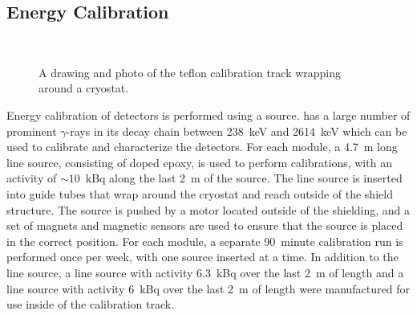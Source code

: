 \documentclass[/main.tex]{subfiles}
\begin{document}
\subsection{Energy Calibration} \label{sec:calibration}
\begin{figure}
  \centering
  ~
  \caption[Calibration track]{\label{fig:caltrack}
    A drawing and photo of the teflon calibration track wrapping around a cryostat.
  }
\end{figure}
Energy calibration of detectors is performed using a  source\cite{mjdcalibration}.
 has a large number of prominent $\gamma$-rays in its decay chain between 238~keV and 2614~keV which can be used to calibrate and characterize the detectors.
For each module, a 4.7~m long line source, consisting of  doped epoxy, is used to perform calibrations, with an activity of $\sim10$~kBq along the last 2~m of the source.
The line source is inserted into guide tubes that wrap around the cryostat and reach outside of the shield structure.
The source is pushed by a motor located outside of the shielding, and a set of magnets and magnetic sensors are used to ensure that the source is placed in the correct position.
For each module, a separate 90~minute calibration run is performed once per week, with one source inserted at a time.
In addition to the  line source, a  line source with activity 6.3~kBq over the last 2~m of length and a  line source with activity 6~kBq over the last 2~m of length were manufactured for use inside of the calibration track.
\end{document}
